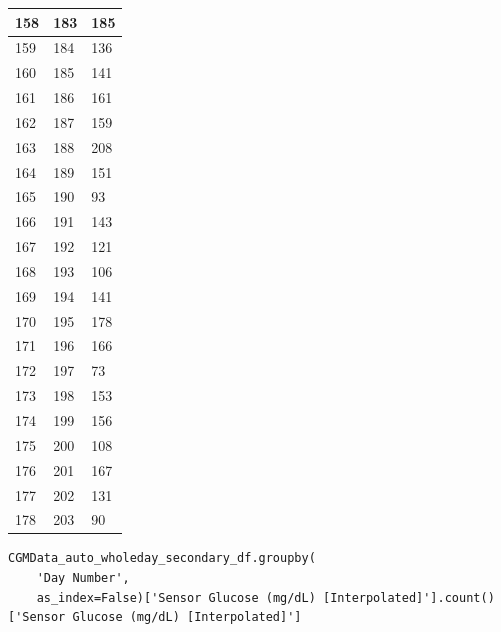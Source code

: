 \begin{tabular}{p{}p{}p{}}
\hline
158 & 183 & 185 \\
\hline
159 & 184 & 136 \\
\hline
160 & 185 & 141 \\
\hline
161 & 186 & 161 \\
\hline
162 & 187 & 159 \\
\hline
163 & 188 & 208 \\
\hline
164 & 189 & 151 \\
\hline
165 & 190 & 93 \\
\hline
166 & 191 & 143 \\
\hline
167 & 192 & 121 \\
\hline
168 & 193 & 106 \\
\hline
169 & 194 & 141 \\
\hline
170 & 195 & 178 \\
\hline
171 & 196 & 166 \\
\hline
172 & 197 & 73 \\
\hline
173 & 198 & 153 \\
\hline
174 & 199 & 156 \\
\hline
175 & 200 & 108 \\
\hline
176 & 201 & 167 \\
\hline
177 & 202 & 131 \\
\hline
178 & 203 & 90 \\
\hline
\bottomrule
\end{tabular}

\bigskip

\begin{verbatim}
CGMData_auto_wholeday_secondary_df.groupby(
    'Day Number', 
    as_index=False)['Sensor Glucose (mg/dL) [Interpolated]'].count()['Sensor Glucose (mg/dL) [Interpolated]']
\end{verbatim}

